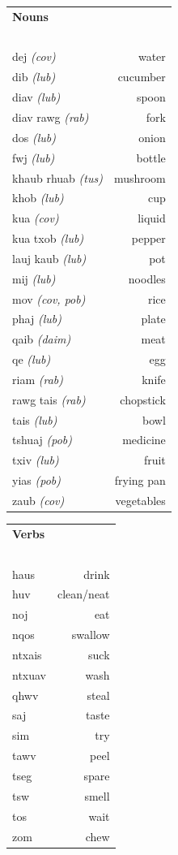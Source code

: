 \documentclass{article}
\begin{document}
\clearpage

\begin{multicols}{2}
[
\section*{}
]

\begin{tabular}{l r}
\textbf{Nouns} \\
~\\
dej {\em (cov)} &water\\
dib {\em (lub)} &cucumber\\
diav {\em (lub)} &spoon\\
diav rawg {\em (rab)} &fork\\
dos {\em (lub)} &onion\\
fwj {\em (lub)} &bottle\\
khaub rhuab {\em (tus)} &mushroom\\
khob {\em (lub)} &cup\\
kua {\em (cov)} &liquid\\
kua txob {\em (lub)} &pepper\\
lauj kaub {\em (lub)} &pot\\
mij {\em (lub)} &noodles\\
mov {\em (cov, pob)} &rice\\
phaj {\em (lub)} &plate\\
qaib {\em (daim)} &meat\\
qe {\em (lub)} &egg\\
riam {\em (rab)} &knife\\
rawg tais {\em (rab)} &chopstick\\
tais {\em (lub)} &bowl\\
tshuaj {\em (pob)} &medicine\\
txiv {\em (lub)} &fruit\\
yias {\em (pob)} &frying pan\\
zaub {\em (cov)} &vegetables\\
\end{tabular}

\begin{tabular}{l r}
\textbf{Verbs} \\
~\\
haus &drink\\
huv &clean/neat\\
noj &eat\\
nqos &swallow\\
ntxais &suck\\
ntxuav &wash\\
qhwv &steal\\
saj &taste\\
sim &try\\
tawv &peel\\
tseg &spare\\
tsw &smell\\
tos &wait\\
zom &chew\\

\end{tabular}
\end{multicols}
\end{document}
